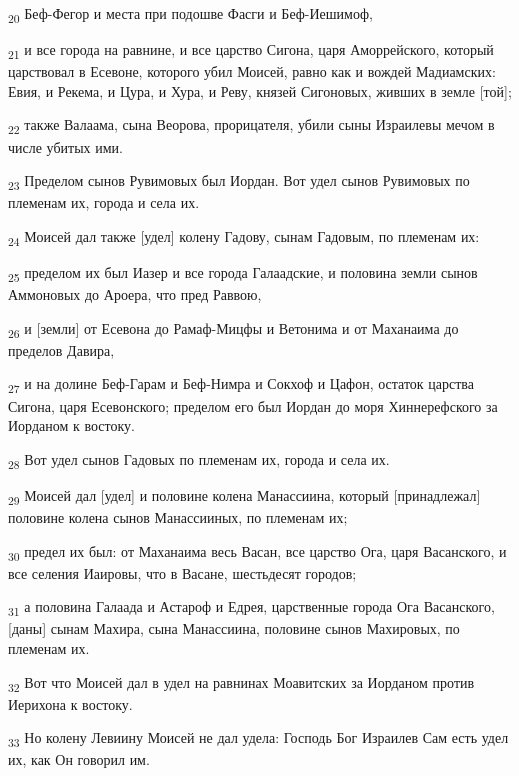 \begin{tcolorbox}
\textsubscript{20} Беф-Фегор и места при подошве Фасги и Беф-Иешимоф,
\end{tcolorbox}
\begin{tcolorbox}
\textsubscript{21} и все города на равнине, и все царство Сигона, царя Аморрейского, который царствовал в Есевоне, которого убил Моисей, равно как и вождей Мадиамских: Евия, и Рекема, и Цура, и Хура, и Реву, князей Сигоновых, живших в земле [той];
\end{tcolorbox}
\begin{tcolorbox}
\textsubscript{22} также Валаама, сына Веорова, прорицателя, убили сыны Израилевы мечом в числе убитых ими.
\end{tcolorbox}
\begin{tcolorbox}
\textsubscript{23} Пределом сынов Рувимовых был Иордан. Вот удел сынов Рувимовых по племенам их, города и села их.
\end{tcolorbox}
\begin{tcolorbox}
\textsubscript{24} Моисей дал также [удел] колену Гадову, сынам Гадовым, по племенам их:
\end{tcolorbox}
\begin{tcolorbox}
\textsubscript{25} пределом их был Иазер и все города Галаадские, и половина земли сынов Аммоновых до Ароера, что пред Раввою,
\end{tcolorbox}
\begin{tcolorbox}
\textsubscript{26} и [земли] от Есевона до Рамаф-Мицфы и Ветонима и от Маханаима до пределов Давира,
\end{tcolorbox}
\begin{tcolorbox}
\textsubscript{27} и на долине Беф-Гарам и Беф-Нимра и Сокхоф и Цафон, остаток царства Сигона, царя Есевонского; пределом его был Иордан до моря Хиннерефского за Иорданом к востоку.
\end{tcolorbox}
\begin{tcolorbox}
\textsubscript{28} Вот удел сынов Гадовых по племенам их, города и села их.
\end{tcolorbox}
\begin{tcolorbox}
\textsubscript{29} Моисей дал [удел] и половине колена Манассиина, который [принадлежал] половине колена сынов Манассииных, по племенам их;
\end{tcolorbox}
\begin{tcolorbox}
\textsubscript{30} предел их был: от Маханаима весь Васан, все царство Ога, царя Васанского, и все селения Иаировы, что в Васане, шестьдесят городов;
\end{tcolorbox}
\begin{tcolorbox}
\textsubscript{31} а половина Галаада и Астароф и Едрея, царственные города Ога Васанского, [даны] сынам Махира, сына Манассиина, половине сынов Махировых, по племенам их.
\end{tcolorbox}
\begin{tcolorbox}
\textsubscript{32} Вот что Моисей дал в удел на равнинах Моавитских за Иорданом против Иерихона к востоку.
\end{tcolorbox}
\begin{tcolorbox}
\textsubscript{33} Но колену Левиину Моисей не дал удела: Господь Бог Израилев Сам есть удел их, как Он говорил им.
\end{tcolorbox}
